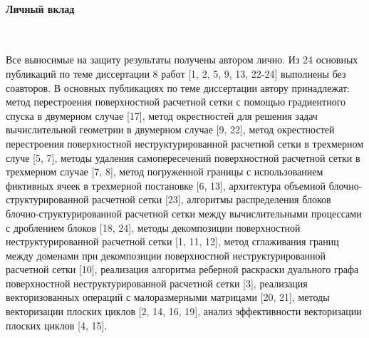 \paragraph{Личный вклад} \

Все выносимые на защиту результаты получены автором лично.
Из 24 основных публикаций по теме диссертации 8 работ [1, 2, 5, 9, 13, 22-24] выполнены без соавторов.
В основных публикациях по теме диссертации автору принадлежат: метод перестроения поверхностной расчетной сетки с помощью градиентного спуска в двумерном случае [17], метод окрестностей для решения задач вычислительной геометрии в двумерном случае [9, 22], метод окрестностей перестроения поверхностной неструктурированной расчетной сетки в трехмерном случе [5, 7], методы удаления самопересечений поверхностной расчетной сетки в трехмерном случае [7, 8], метод погруженной границы с использованием фиктивных ячеек в трехмерной постановке [6, 13], архитектура объемной блочно-структурированной расчетной сетки [23], алгоритмы распределения блоков блочно-структурированной расчетной сетки между вычислительными процессами с дроблением блоков [18, 24], методы декомпозиции поверхностной неструктурированной расчетной сетки [1, 11, 12], метод сглаживания границ между доменами при декомпозиции поверхностной неструктурированной расчетной сетки [10], реализация алгоритма реберной раскраски дуального графа поверхностной неструктурированной расчетной сетки [3], реализация векторизованных операций с малоразмерными матрицами [20, 21], методы векторизации плоских циклов [2, 14, 16, 19], анализ эффективности векторизации плоских циклов [4, 15].
